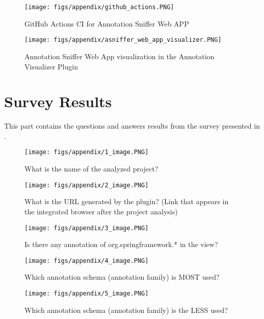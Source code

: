 \begin{apendicesenv}
\begin{figure}[ht]
  \texttt{[image: figs/appendix/github\_actions.PNG]}
  \caption{GitHub Actions CI for Annotation Sniffer Web APP}
  \label{fig:github_actions}
\end{figure}

\begin{figure}[ht]
  \texttt{[image: figs/appendix/asniffer\_web\_app\_visualizer.PNG]}
  \caption{Annotation Sniffer Web App visualization in the Annotation Visualizer Plugin}
  \label{fig:asniffer_web_app_visualizer}
\end{figure}

\chapter{Survey Results}\label{cap:appendixB}

This part contains the questions and answers results from the survey presented in . 

\begin{figure}[ht]
  \texttt{[image: figs/appendix/1\_image.PNG]}
  \caption{What is the name of the analyzed project?}
  \label{fig:project_name}
\end{figure}

\begin{figure}[ht]
  \texttt{[image: figs/appendix/2\_image.PNG]}
  \caption{What is the URL generated by the plugin? (Link that appears in the integrated browser after the project analysis)}
  \label{fig:url_generated}
\end{figure}

\begin{figure}[ht]
  \texttt{[image: figs/appendix/3\_image.PNG]}
  \caption{Is there any annotation of org.springframework.* in the view?}
  \label{fig:springframework_annotation}
\end{figure}

\begin{figure}[ht]
  \texttt{[image: figs/appendix/4\_image.PNG]}
  \caption{Which annotation schema (annotation family) is MOST used?}
  \label{fig:more_used}
\end{figure}

\begin{figure}[ht]
  \texttt{[image: figs/appendix/5\_image.PNG]}
  \caption{Which annotation schema (annotation family) is the LESS used?}
  \label{fig:less_used}
\end{figure}


\end{apendicesenv}

